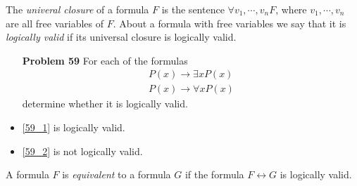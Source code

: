 \noindent
The \textit{univeral closure} of a formula $F$ is the sentence $\forall v_1, \cdots, v_n F$, where $v_1, \cdots, v_n$ are all free variables of $F$. About a formula with free variables we say that it is \textit{logically valid} if its universal closure is logically valid. 

\begin{enumerate}
\item[\textbf{Problem 59}] For each of the formulas 
\begin{eqnarray}
     \label{59_1}
     P(x) \rightarrow \exists x P(x) \\ 
     \label{59_2}
     P(x) \rightarrow \forall x P(x) 
\end{eqnarray}
determine whether it is logically valid. 
\end{enumerate}
\begin{itemize}
\item \eqref{59_1} is logically valid. \\
\item \eqref{59_2} is not logically valid. \\
\end{itemize}

\vspace{6cm}

\noindent
A formula $F$ is \textit{equivalent} to a formula $G$ if the formula $F \leftrightarrow G$ is logically valid. 

